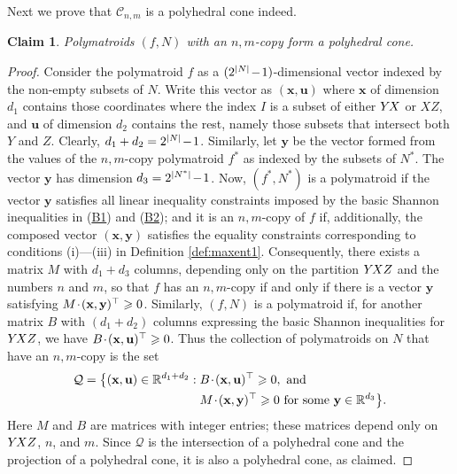 \documentclass[reqno]{amsart}
\newtheorem{claim}[theorem]{Claim}
\theoremstyle{definition}
\newcommand\tsp{\mkern 1.5mu}
\renewcommand\ge{\geqslant}\renewcommand\le{\leqslant}
\newcommand\C{\mathcal C}
\newcommand\R{\mathbb R}  %
\newcommand\T{\top}       %
\def\m#1{\tsp{#1}\tsp}
\def\YXZ{Y\mkern-2mu XZ}
\def\YX{Y\mkern-2mu X}
\newcommand\bref[1]{\hyperlink{#1}{#1}}
\begin{document}
\smallskip
Next we prove that $\C_{n,m}$ is a polyhedral cone indeed.

\begin{claim}\label{claim:mempoly}
Polymatroids $(f,N)$ with an $n,m$-copy form a polyhedral cone.
\end{claim}

\begin{proof}
Consider the polymatroid $f$ as a $(2^{|N|}\m-1)$-dimensional vector indexed
by the non-empty subsets of $N$. Write this vector as $(\mathbf x,\mathbf
u)$ where $\mathbf x$ of dimension $d_1$ contains those coordinates where
the index $I$ is a subset of either $\YX$ or $XZ$, and $\mathbf u$ of
dimension $d_2$ contains the rest, namely those subsets that intersect both
$Y$ and $Z$. Clearly, $d_1+d_2=2^{|N|}\m-1$. Similarly, let $\mathbf y$ be
the vector formed from the values of the $n,m$-copy polymatroid $f^*$ as
indexed by the subsets of $N^*$. The vector $\mathbf y$ has dimension
$d_3=2^{|N^*|}\m-1$. Now, $(f^*,N^*)$ is a polymatroid if the vector
$\mathbf y$ satisfies all linear inequality constraints imposed by the basic
Shannon inequalities in (\bref{B1}) and (\bref{B2}); and it is an $n,m$-copy
of $f$ if, additionally, the composed vector $(\mathbf x,\mathbf y)$
satisfies the equality constraints corresponding to conditions (i)---(iii)
in Definition \ref{def:maxent1}. Consequently, there exists a matrix $M$
with $d_1+d_3$ columns, depending only on the partition $\YXZ$ and the
numbers $n$ and $m$, so that $f$ has an $n,m$-copy if and only if there is a
vector $\mathbf y$ satisfying $M\m\cdot (\mathbf x,\mathbf y)^\T\ge 0$.
Similarly, $(f,N)$ is a polymatroid if, for another matrix $B$ with
$(d_1+d_2)$ columns expressing the basic Shannon inequalities for $\YXZ$, we
have $B\m\cdot(\mathbf x, \mathbf u)^\T\ge 0$. Thus the collection of
polymatroids on $N$ that have an $n,m$-copy is the set
\begin{align*}
    \mathcal Q = \big\{(\mathbf x,\mathbf u)\in\R^{d_1+d_2} :{}&
       B\m\cdot(\mathbf x,\mathbf u)^\T\ge 0, \mbox{ and}\\
       & M\m\cdot (\mathbf x,\mathbf y)^\T\ge 0
       \mbox{ for some } \mathbf y\in\R^{d_3}
    \big\}.
\end{align*}
Here $M$ and $B$ are matrices with integer entries; these matrices depend
only on $\YXZ$, $n$, and $m$. Since $\mathcal Q$ is the intersection of a
polyhedral cone and the projection of a polyhedral cone, it is also a
polyhedral cone, as claimed.
\end{proof}
\end{document}
